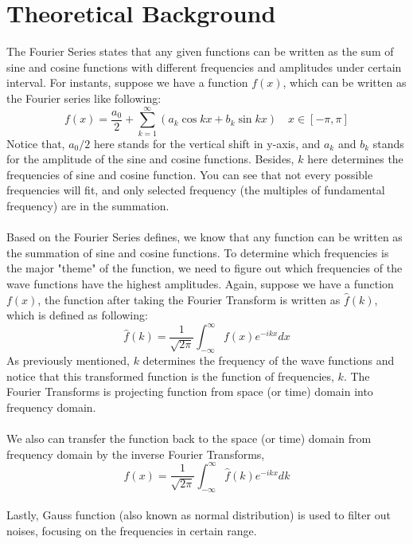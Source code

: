 \documentclass{article}
\begin{document}
\section{Theoretical Background}
The Fourier Series states that any given functions can be written as the sum of sine and cosine functions with different frequencies and amplitudes under certain interval. For instants, suppose we have a function $f(x)$, which can be written as the Fourier series like following:
\begin{equation}
    f(x) = \frac{a_0}{2} + \sum_{k=1}^\infty \left(a_k\cos{kx} + b_k\sin{kx}\right) \quad x \in [-\pi, \pi]
    \label{eqn:fourierseries}
\end{equation}
Notice that, $a_0/2$ here stands for the vertical shift in y-axis, and $a_k$ and $b_k$ stands for the amplitude of the sine and cosine functions. Besides, $k$ here determines the frequencies of sine and cosine function. You can see that not every possible frequencies will fit, and only selected frequency (the multiples of fundamental frequency) are in the summation. \\
~\\
Based on the Fourier Series defines, we know that any function can be written as the summation of sine and cosine functions. To determine which frequencies is the major "theme" of the function, we need to figure out which frequencies of the wave functions have the highest amplitudes. Again, suppose we have a function $f(x)$, the function after taking the Fourier Transform is written as $\hat{f}(k)$, which is defined as following:
\begin{equation}
    \hat{f}(k) = \frac{1}{\sqrt{2\pi}}\int_{-\infty}^\infty f(x) e^{-ikx} dx
    \label{eqn:fouriertransform}
\end{equation}
As previously mentioned, $k$ determines the frequency of the wave functions and notice that this transformed function is the function of frequencies, $k$. The Fourier Transforms is projecting function from space (or time) domain into frequency domain. \\
~\\
We also can transfer the function back to the space (or time) domain from frequency domain by the inverse Fourier Transforms, 
\begin{equation}
    f(x) = \frac{1}{\sqrt{2\pi}}\int_{-\infty}^\infty \hat{f}(k) e^{-ikx} dk
    \label{eqn:inversefouriertransform}
\end{equation}
~\\
Lastly, Gauss function (also known as normal distribution) is used to filter out noises, focusing on the frequencies in certain range. 
\end{document}
